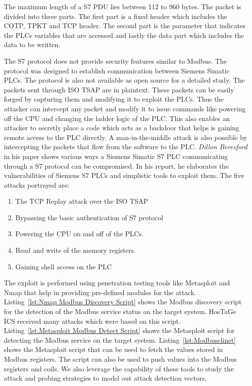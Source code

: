 \documentclass[article,msc=informatik,type=msc,colorback,accentcolor=tud9c]{tudthesis}
\begin{document}
    
     \vspace{3mm}
    The maximum length of a S7 \ac{PDU} lies between 112 to 960 bytes. The packet is divided into three parts. The first part is a fixed header which includes the \ac{COTP}, TPKT and \ac{TCP} header. The second part is the parameter that indicates the \ac{PLC}s variables that are accessed and lastly the data part which includes the data to be written. 
    
    
    \vspace{3mm}
   The S7 protocol does not provide security features similar to Modbus. The protocol was designed to establish communication between Siemens Simatic \ac{PLC}s. The protocol is also not available as open source for a detailed study. The packets sent through ISO TSAP \cite{rose1987iso} are in plaintext. These packets can be easily forged by capturing them and modifying it to exploit the \ac{PLC}s. Thus the attacker can intercept any packet and modify it to issue commands like powering off the CPU and changing the ladder logic of the \ac{PLC}. This also enables an attacker to secretly place a code which acts as a backdoor that helps is gaining remote access to the \ac{PLC} directly. A man-in-the-middle attack is also possible by intercepting the packets that flow from the software to the \ac{PLC}.
   \textit{Dillon Beresford } in his paper \cite{beresford2011exploiting} shows various ways a Siemens Simatic S7 \ac{PLC} communicating through a S7 protocol can be compromised. In his report, he elaborates the vulnerabilities of Siemens S7 \ac{PLC}s and simplistic tools to exploit them. The five attacks portrayed are:
   
   \begin{enumerate}
   
   
   \item The TCP Replay attack over the ISO TSAP
   \item Bypassing the basic authentication of S7 protocol
   \item Powering the CPU on and off of the \ac{PLC}s.
   \item Read and write of the memory registers.
   \item Gaining shell access on the \ac{PLC}
   
   
   \end{enumerate} 
   
   
   The exploit is performed using penetration testing tools like Metasploit \cite{maynor2011metasploit} and Nmap \cite{lyon2009nmap}  that help in providing pre-defined modules for the attack. Listing~\ref{lst:Nmap Modbus Discovery Script} shows the Modbus discovery script for the detection of the Modbus service status on the target system. HosTaGe ICS received many attacks which were based on this script. Listing~\ref{lst:Metasploit Modbus Detect Script} shows the Metasploit script for detecting the Modbus service on the target system. Listing~\ref{lst:Modbusclinet} shows the Metasploit script that can be used to fetch the values stored in Modbus registers. The script can also be used to push values into the Modbus registers and coils.
   We also leverage the capability of these tools to study the attack and probing strategies to model out attack detection vectors. 
   
\end{document}
